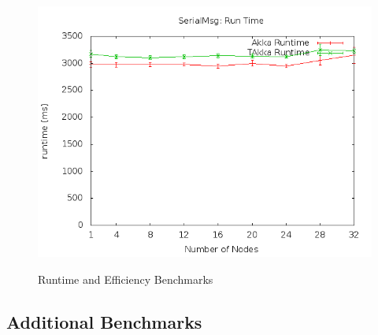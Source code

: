 \begin{figure}[p]
\begin{center}
{            \includegraphics[scale=0.31]{efficiency/SerialMsg_time.png}
        }
        \\
    \end{center}
    \caption{Runtime and Efficiency Benchmarks}
   \label{runtime_efficiency}
\end{figure}


\newpage

\subsection{Additional Benchmarks}
\label{bench_fib}

